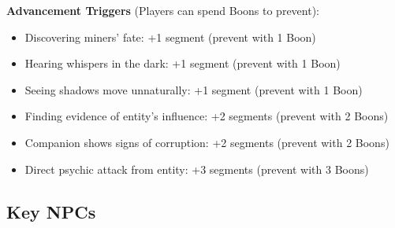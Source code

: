 \documentclass[11pt]{article}
\begin{document}
\textbf{Advancement Triggers} (Players can spend Boons to prevent):
\begin{itemize}[leftmargin=*]
\item Discovering miners' fate: +1 segment (prevent with 1 Boon)
\item Hearing whispers in the dark: +1 segment (prevent with 1 Boon)
\item Seeing shadows move unnaturally: +1 segment (prevent with 1 Boon)
\item Finding evidence of entity's influence: +2 segments (prevent with 2 Boons)
\item Companion shows signs of corruption: +2 segments (prevent with 2 Boons)
\item Direct psychic attack from entity: +3 segments (prevent with 3 Boons)
\end{itemize}

\subsection*{Key NPCs}
\end{document}
